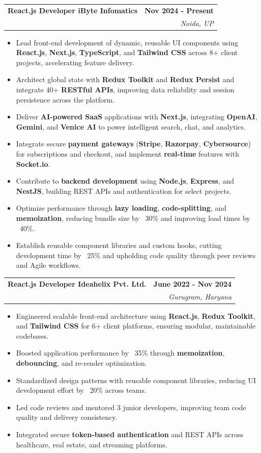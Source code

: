 \documentclass[letterpaper,11pt]{article}
\makeatletter
\newcommand{\resumeItem}[1]{
  \item\small{
    {#1 \vspace{-2pt}}
  }
}
\newcommand{\resumeSubheading}[4]{
  \vspace{-2pt}\item
    \begin{tabular*}{1.0\textwidth}[t]{l@{\extracolsep{\fill}}r}
      \textbf{\large#1} & \textbf{\small #2} \\
      \textit{\large#3} & \textit{\small #4} \\
    \end{tabular*}\vspace{-7pt}
}
\newcommand{\resumeItemListStart}{\begin{itemize}}
\newcommand{\resumeItemListEnd}{\end{itemize}\vspace{-5pt}}
\makeatother
\begin{document}
    \resumeSubheading
     {\textbf{React.js Developer} \textbar{} \textbf{iByte Infomatics}}{\textbf{Nov 2024 - Present}}
      {}{Noida, UP}
      \resumeItemListStart
        \resumeItem{\normalsize{Lead front-end development of dynamic, reusable UI components using \textbf{React.js}, \textbf{Next.js}, \textbf{TypeScript}, and \textbf{Tailwind CSS} across 8+ client projects, accelerating feature delivery.}}
        \resumeItem{\normalsize{Architect global state with \textbf{Redux Toolkit} and \textbf{Redux Persist} and integrate 40+ \textbf{RESTful APIs}, improving data reliability and session persistence across the platform.}}
        \resumeItem{\normalsize{Deliver \textbf{AI-powered SaaS} applications with \textbf{Next.js}, integrating \textbf{OpenAI}, \textbf{Gemini}, and \textbf{Venice AI} to power intelligent search, chat, and analytics.}}
        \resumeItem{\normalsize{Integrate secure \textbf{payment gateways} (\textbf{Stripe}, \textbf{Razorpay}, \textbf{Cybersource}) for subscriptions and checkout, and implement \textbf{real-time} features with \textbf{Socket.io}.}}
        \resumeItem{\normalsize{Contribute to \textbf{backend development} using \textbf{Node.js}, \textbf{Express}, and \textbf{NestJS}, building REST APIs and authentication for select projects.}}
        \resumeItem{\normalsize{Optimize performance through \textbf{lazy loading}, \textbf{code-splitting}, and \textbf{memoization}, reducing bundle size by ~30\% and improving load times by ~40\%.}}
        \resumeItem{\normalsize{Establish reusable component libraries and custom hooks, cutting development time by ~25\% and upholding code quality through peer reviews and Agile workflows.}}
      \resumeItemListEnd

    \resumeSubheading
     {\textbf{React.js Developer} \textbar{} \textbf{Ideahelix Pvt. Ltd.}}{\textbf{June 2022 - Nov 2024}}
      {}{Gurugram, Haryana}
      \resumeItemListStart
        \resumeItem{\normalsize{Engineered scalable front-end architecture using \textbf{React.js}, \textbf{Redux Toolkit}, and \textbf{Tailwind CSS} for 6+ client platforms, ensuring modular, maintainable codebases.}}
        \resumeItem{\normalsize{Boosted application performance by ~35\% through \textbf{memoization}, \textbf{debouncing}, and re-render optimization.}}
        \resumeItem{\normalsize{Standardized design patterns with reusable component libraries, reducing UI development effort by ~20\% across teams.}}
        \resumeItem{\normalsize{Led code reviews and mentored 3 junior developers, improving team code quality and delivery consistency.}}
        \resumeItem{\normalsize{Integrated secure \textbf{token-based authentication} and REST APIs across healthcare, real estate, and streaming platforms.}}
      \resumeItemListEnd
\end{document}
